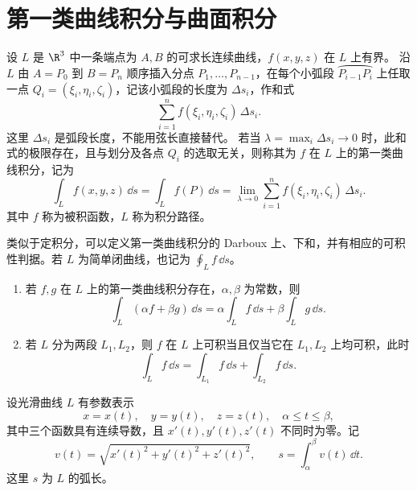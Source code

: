\section{第一类曲线积分与曲面积分}

\begin{definition}
设 $L$ 是 $\R^3$ 中一条端点为 $A,B$ 的可求长连续曲线，$f(x,y,z)$ 在 $L$ 上有界。
沿 $L$ 由 $A=P_0$ 到 $B=P_n$ 顺序插入分点 $P_1,\ldots,P_{n-1}$，在每个小弧段 $\wideparen{P_{i-1}P_i}$ 上任取一点 $Q_i=(\xi_i,\eta_i,\zeta_i)$，记该小弧段的长度为 $\Delta s_i$，作和式
\[
\sum_{i=1}^n f(\xi_i,\eta_i,\zeta_i)\,\Delta s_i.
\]
这里 $\Delta s_i$ 是弧段长度，不能用弦长直接替代。
若当 $\lambda=\max_i\Delta s_i\to0$ 时，此和式的极限存在，且与划分及各点 $Q_i$ 的选取无关，则称其为 $f$ 在 $L$ 上的第一类曲线积分，记为
\[
\int_L f(x,y,z)\,\dd s=\int_L f(P)\,\dd s
=\lim_{\lambda\to0}\sum_{i=1}^n f(\xi_i,\eta_i,\zeta_i)\,\Delta s_i.
\]
其中 $f$ 称为被积函数，$L$ 称为积分路径。
\end{definition}

类似于定积分，可以定义第一类曲线积分的 Darboux 上、下和，并有相应的可积性判据。若 $L$ 为简单闭曲线，也记为 $\displaystyle\oint_L f\,\dd s$。

\begin{proposition}
\begin{enumerate}
\item 若 $f,g$ 在 $L$ 上的第一类曲线积分存在，$\alpha,\beta$ 为常数，则
\[
\int_L(\alpha f+\beta g)\,\dd s=\alpha\int_Lf\,\dd s+\beta\int_Lg\,\dd s.
\]
\item 若 $L$ 分为两段 $L_1,L_2$，则 $f$ 在 $L$ 上可积当且仅当它在 $L_1,L_2$ 上均可积，此时
\[
\int_Lf\,\dd s=\int_{L_1}f\,\dd s+\int_{L_2}f\,\dd s.
\]
\end{enumerate}
\end{proposition}


设光滑曲线 $L$ 有参数表示
\[
x=x(t),\quad y=y(t),\quad z=z(t),\quad \alpha\le t\le\beta,
\]
其中三个函数具有连续导数，且 $x'(t),y'(t),z'(t)$ 不同时为零。记
\[
v(t)=\sqrt{x'(t)^2+y'(t)^2+z'(t)^2},\qquad
s=\int_\alpha^\beta v(t)\,\dd t.
\]
这里 $s$ 为 $L$ 的弧长。

